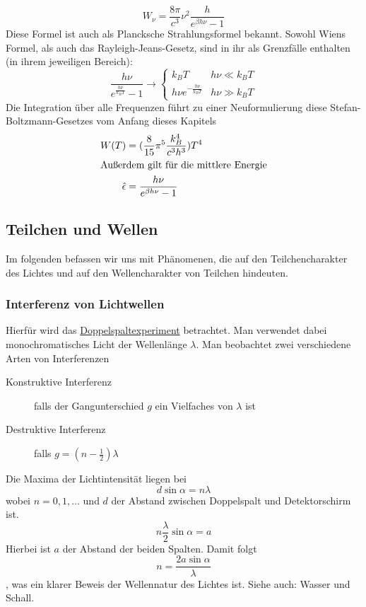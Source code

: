 $$W_\nu = \frac{8\pi}{c^3} \nu^2 \frac{h}{e^{\beta h \nu} - 1}$$
Diese Formel ist auch als Plancksche Strahlungsformel bekannt. Sowohl Wiens Formel, als auch das Rayleigh-Jeans-Gesetz, sind in ihr als Grenzfälle enthalten (in ihrem jeweiligen Bereich):
$$\frac{h \nu}{e^{\frac{h\nu}{k_B T}} - 1} \rightarrow \begin{cases}
k_B T & h\nu \ll k_B T\\
h \nu e^{- \frac{h\nu}{k_B T}} & h \nu \gg k_B T
\end{cases}$$
Die Integration über alle Frequenzen führt zu einer Neuformulierung diese Stefan-Boltzmann-Gesetzes vom Anfang dieses Kapitels
\begin{align*}
W(T) &= (\frac{8}{15} \pi^5 \frac{k_B^4}{c^3 h^3}) T^4\\
\intertext{Außerdem gilt für die mittlere Energie}
\hat{\epsilon} &= \frac{h \nu}{e^{\beta h \nu} - 1} 
\end{align*}

\subsection{Teilchen und Wellen}
Im folgenden befassen wir uns mit Phänomenen, die auf den Teilchencharakter des Lichtes und auf den Wellencharakter von Teilchen hindeuten.

\subsubsection{Interferenz von Lichtwellen}
Hierfür wird das \href{https://de.wikipedia.org/wiki/Doppelspaltexperiment}{Doppelspaltexperiment} betrachtet. Man verwendet dabei monochromatisches Licht der Wellenlänge $\lambda$. Man beobachtet zwei verschiedene Arten von Interferenzen
\begin{description}
	\item[Konstruktive Interferenz] falls der Gangunterschied $g$ ein Vielfaches von $\lambda$ ist
	\item[Destruktive Interferenz] falls $g = (n - \frac12) \lambda$
\end{description}
Die Maxima der Lichtintensität liegen bei
$$d \sin \alpha = n\lambda$$
wobei $n = 0, 1, \dots$ und $d$ der Abstand zwischen Doppelspalt und Detektorschirm ist.\
$$n \frac{\lambda}{2} \sin \alpha = a$$
Hierbei ist $a$ der Abstand der beiden Spalten.
Damit folgt 
$$n = \frac{2a \sin \alpha}{\lambda}$$
, was ein klarer Beweis der Wellennatur des Lichtes ist. Siehe auch: Wasser und Schall.

